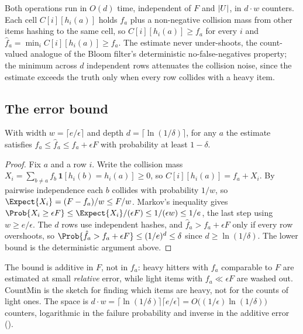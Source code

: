 Both operations run in $O(d)$ time, independent of $F$ and $|U|$, in
$d \cdot w$ counters. Each cell $C[i][h_i(a)]$ holds $f_a$ plus a non-negative
collision mass from other items hashing to the same cell, so $C[i][h_i(a)] \ge
f_a$ for every $i$ and $\hat f_a = \min_i C[i][h_i(a)] \ge f_a$. The estimate
never under-shoots, the count-valued analogue of the Bloom
filter's deterministic
no-false-negatives property; the minimum across $d$ independent rows attenuates
the collision noise, since the estimate exceeds the truth only when every row
collides with a heavy item.

\subsection*{The error bound}

\begin{theorem}
\label{thm:countmin-bound}
With width $w = \lceil e/\epsilon \rceil$ and depth $d = \lceil \ln(1/\delta)
\rceil$, for any $a$ the estimate satisfies $f_a \le \hat f_a \le f_a + \epsilon
F$ with probability at least $1 - \delta$.
\end{theorem}

\begin{proof}
Fix $a$ and a row $i$. Write the collision mass $X_i = \sum_{b \neq a} f_b\,
\mathbf{1}[h_i(b) = h_i(a)] \ge 0$, so $C[i][h_i(a)] = f_a + X_i$. By pairwise
independence each $b$ collides with probability $1/w$, so $\Expect{X_i} =
(F - f_a)/w \le F/w$. Markov's inequality gives $\Prob{X_i \ge \epsilon F} \le
\Expect{X_i}/(\epsilon F) \le 1/(\epsilon w) \le 1/e$, the last step using
$w \ge e/\epsilon$. The $d$ rows use independent hashes, and $\hat f_a >
f_a + \epsilon F$ only if every row overshoots, so $\Prob{\hat f_a > f_a +
\epsilon F} \le (1/e)^d \le \delta$ since $d \ge \ln(1/\delta)$. The lower
bound is the deterministic argument above.
\end{proof}

The bound is additive in $F$, not in $f_a$: heavy hitters with $f_a$ comparable
to $F$ are estimated at small \emph{relative} error, while light items with
$f_a \ll \epsilon F$ are washed out. CountMin is the sketch for finding which
items are heavy, not for the counts of light ones. The space is $d \cdot w =
\lceil \ln(1/\delta) \rceil \lceil e/\epsilon \rceil = O\big((1/\epsilon)
\ln(1/\delta)\big)$ counters, logarithmic in the failure probability and
inverse in the additive error (\textcite{cormode-muthukrishnan-2005}).

